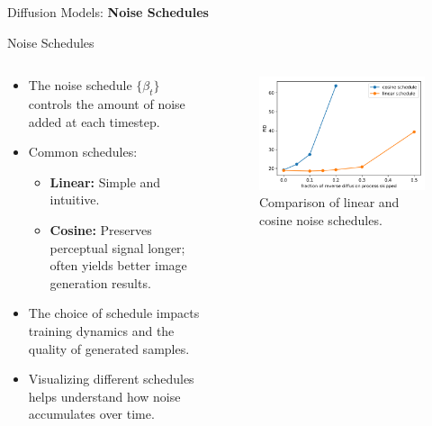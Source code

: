 \begin{frame}{}
    \LARGE Diffusion Models: \textbf{Noise Schedules}
\end{frame}


\begin{frame}{Noise Schedules}
    \begin{columns}
    \begin{column}{0.45\textwidth}
       \begin{itemize}
            \item The noise schedule $\{\beta_t\}$ controls the amount of noise added at each timestep.
            \item<2-> Common schedules:
            \begin{itemize}
                \item \textbf{Linear:} Simple and intuitive.
                \item \textbf{Cosine:} Preserves perceptual signal longer; often yields better image generation results.
            \end{itemize}
            \item<3-> The choice of schedule impacts training dynamics and the quality of generated samples.
            \item<4-> Visualizing different schedules helps understand how noise accumulates over time.
        \end{itemize}
    \end{column}
    \begin{column}{0.55\textwidth}
        \begin{figure}
            \centering
            \includegraphics[height=\textheight, width=\textwidth, keepaspectratio]{images/diffusion/noise_schedules.png}
            \caption*{Comparison of linear and cosine noise schedules.}
        \end{figure}
    \end{column}
\end{columns}
\end{frame}